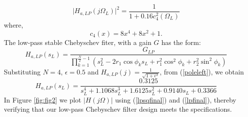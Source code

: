\documentclass[journal,12pt,twocolumn]{IEEEtran}
\theoremstyle{remark}
\begin{document}
\begin{equation}
\label{lpsqfinal}
\vert H_{a,LP}(j\Omega_L)\vert^2 = \frac{1}{1 + 0.16c_4^2(\Omega_L)}
\end{equation}
where,
\begin{equation}
c_4(x) = 8x^4 + 8x^2 + 1.	
\end{equation}
The low-pass stable Chebyschev fiter, with a gain $G$ has the form:
\begin{equation}
\label{poleleft}
H_{a,LP}(s_L) = \frac{G_{LP}}{\prod_{k = 1}^{\frac{N}{2}-1}(s_L^2 - 2r_1\cos\phi_ks_L + r_1^2\cos^2\phi_k + r_2^2 \sin^2\phi_k)}
\end{equation}
Substituting $N = 4$, $\epsilon = 0.5$ and $H_{a,LP}(j) = \frac{1}{\sqrt{1+\epsilon^2}}$, from (\ref{poleleft}), we obtain 
\begin{equation}
\label{lpfinal}
H_{a,LP}(s_L) = \frac{0.3125}{s_L^4 + 1.1068s_L^3 + 1.6125s_L^2+0.9140s_L + 0.3366}
\end{equation}
In Figure \eqref{fig:fig2} we plot $|H(j\Omega)|$ using (\ref{lpsqfinal}) and (\ref{lpfinal}), thereby verifying that our low-pass Chebyschev filter design meets the specifications.
\end{document}
